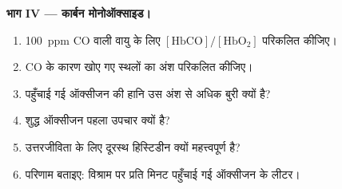 \begin{problem}
\medskip\noindent\textbf{भाग IV --- कार्बन मोनोऑक्साइड।}
\begin{enumerate}[resume]
  \item \qty{100}{ppm} CO वाली वायु के लिए $[\mathrm{HbCO}]/[\mathrm{HbO_2}]$ परिकलित कीजिए।
  \item CO के कारण खोए गए स्थलों का अंश परिकलित कीजिए।
  \item पहुँचाई गई ऑक्सीजन की हानि उस अंश से अधिक बुरी क्यों है?
  \item शुद्ध ऑक्सीजन पहला उपचार क्यों है?
  \item उत्तरजीविता के लिए दूरस्थ हिस्टिडीन क्यों महत्त्वपूर्ण है?
  \item परिणाम बताइए: विश्राम पर प्रति मिनट पहुँचाई गई ऑक्सीजन के लीटर।
\end{enumerate}
\end{problem}
